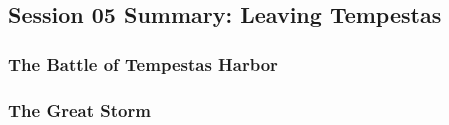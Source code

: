 \subsection{Session 05 Summary: Leaving Tempestas}

\subsubsection{The Battle of Tempestas Harbor}

\subsubsection{The Great Storm}